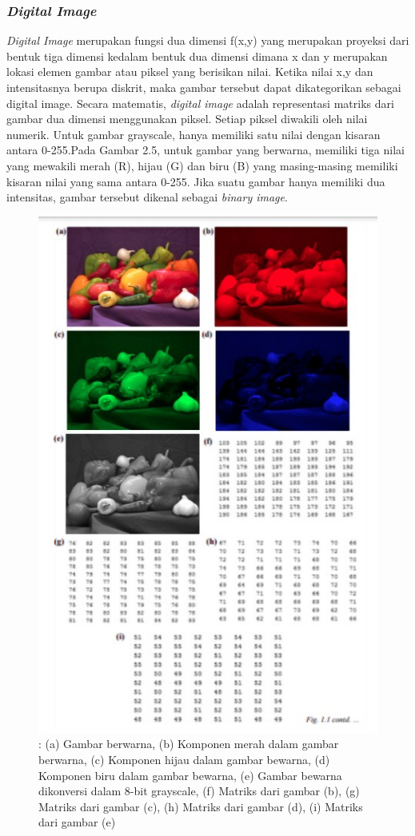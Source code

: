 \subsubsection{\emph{Digital Image}}
\label{subsec:digital-image}
\emph{Digital Image} merupakan fungsi dua dimensi f(x,y) yang merupakan proyeksi dari bentuk tiga dimensi kedalam bentuk dua dimensi dimana x dan y merupakan lokasi elemen gambar atau piksel yang berisikan nilai. Ketika nilai x,y dan intensitasnya berupa
diskrit, maka gambar tersebut dapat dikategorikan sebagai digital
image. Secara matematis, \emph{digital image} adalah representasi matriks
dari gambar dua dimensi menggunakan piksel. Setiap piksel diwakili oleh nilai numerik. Untuk gambar grayscale, hanya memiliki satu
nilai dengan kisaran antara 0-255.Pada Gambar 2.5, untuk gambar yang berwarna, memiliki tiga nilai yang mewakili merah (R),
hijau (G) dan biru (B) yang masing-masing memiliki kisaran nilai
yang sama antara 0-255. Jika suatu gambar hanya memiliki dua
intensitas, gambar tersebut dikenal sebagai \emph{binary image}.
\begin{figure}[ht]
  \centering
  \includegraphics[scale=0.7]{gambar/digital-image-arch.jpg}
  \caption{: (a) Gambar berwarna, (b) Komponen merah dalam gambar berwarna, (c) Komponen hijau dalam gambar bewarna, (d) Komponen biru dalam gambar bewarna, (e) Gambar bewarna dikonversi dalam
  8-bit grayscale, (f) Matriks dari gambar (b), (g) Matriks dari gambar (c),
  (h) Matriks dari gambar (d), (i) Matriks dari gambar (e)}
  \label{fig:digital-image}
\end{figure}

